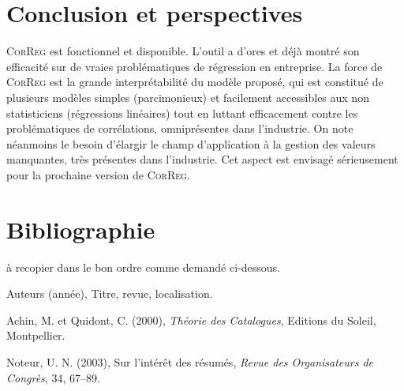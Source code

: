 \documentclass[12pt]{article}
\begin{document}
\section{Conclusion et perspectives}
	\textsc{CorReg} est fonctionnel et disponible. L'outil a d'ores et déjà montré son efficacité sur de vraies problématiques de régression en entreprise.
	La force de \textsc{CorReg} est la grande interprétabilité du modèle proposé, qui est constitué de plusieurs modèles simples (parcimonieux) et facilement accessibles aux non statisticiens (régressions linéaires) tout en luttant efficacement contre les problématiques de corrélations, omniprésentes dans l'industrie.
	On note néanmoins le besoin d'élargir le champ d'application à la gestion des valeurs manquantes, très présentes dans l'industrie. Cet aspect est envisagé sérieusement pour la prochaine version de \textsc{CorReg}.
	

\section*{Bibliographie}
{}

à recopier dans le bon ordre comme demandé ci-dessous.

\noindent [1] Auteurs (année), Titre, revue, localisation.

\noindent [2] Achin, M. et Quidont, C. (2000), {\it Théorie des
Catalogues}, Editions du Soleil, Montpellier.

\noindent [3] Noteur, U. N. (2003), Sur l'intér\^et des
résumés, {\it Revue des Organisateurs de Congrès}, 34, 67--89.
\end{document}
